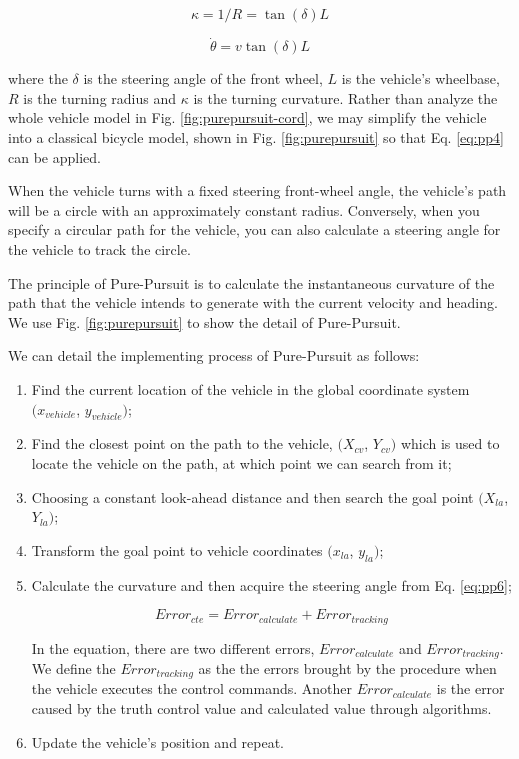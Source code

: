 \begin{equation} \label{eq:pp4}
\kappa = 1/R = \tan(\delta)L 
\end{equation}

\begin{equation} \label{eq:pp5}
\dot{\theta} = v \tan(\delta)L
\end{equation}

where the $\delta$ is the steering angle of the front wheel, $L$ is the vehicle's wheelbase, $R$ is the turning radius and $\kappa$ is the turning curvature. Rather than analyze the whole vehicle model in Fig. \ref{fig:purepursuit-cord}, we may simplify the vehicle into a classical bicycle model, shown in Fig. \ref{fig:purepursuit} so that Eq. \ref{eq:pp4} can be applied.

When the vehicle turns with a fixed steering front-wheel angle, the vehicle's path will be a circle with an approximately constant radius. Conversely, when you specify a circular path for the vehicle, you can also calculate a steering angle for the vehicle to track the circle. 

The principle of Pure-Pursuit is to calculate the instantaneous curvature of the path that the vehicle intends to generate with the current velocity and heading. We use Fig. \ref{fig:purepursuit} to show the detail of Pure-Pursuit.

We can detail the implementing process of Pure-Pursuit as follows:

\begin{enumerate}
\item Find the current location of the vehicle in the global coordinate system $(x_{vehicle}$, $y_{vehicle})$;
\item Find the closest point on the path to the vehicle, $(X_{cv}$, $Y_{cv})$ which is used to locate the vehicle on the path, at which point we can search from it;
\item Choosing a constant look-ahead distance and then search the goal point $(X_{la}$, $Y_{la})$;
\item Transform the goal point to vehicle coordinates $(x_{la}$, $y_{la})$;
\item Calculate the curvature and then acquire the steering angle from Eq. \ref{eq:pp6};

\begin{equation} \label{eq:pp6}
Error_{cte} = Error_{calculate} + Error_{tracking}
\end{equation}

In the equation, there are two different errors, $Error_{calculate}$ and $Error_{tracking}$. We define the $Error_{tracking}$ as the the errors brought by the procedure when the vehicle executes the control commands. Another $Error_{calculate}$ is the error caused by the truth control value and calculated value through algorithms.

\item Update the vehicle's position and repeat.
\end{enumerate}

